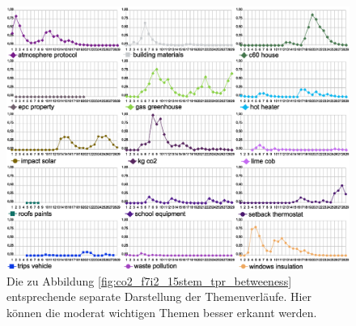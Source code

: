 \begin{figure}[ht]
\includegraphics[width=\textwidth]{images/content/06_results/runs/co2_f7i2_15nostem_tpr_betweenness_seperate.eps} 
\caption{Die zu Abbildung \ref{fig:co2_f7i2_15stem_tpr_betweeness} entsprechende separate Darstellung der Themenverläufe. Hier können die moderat wichtigen Themen besser erkannt werden.}
\label{fig:co2_f7i2_15stem_tpr_betweeness_seperated}
\end{figure}

